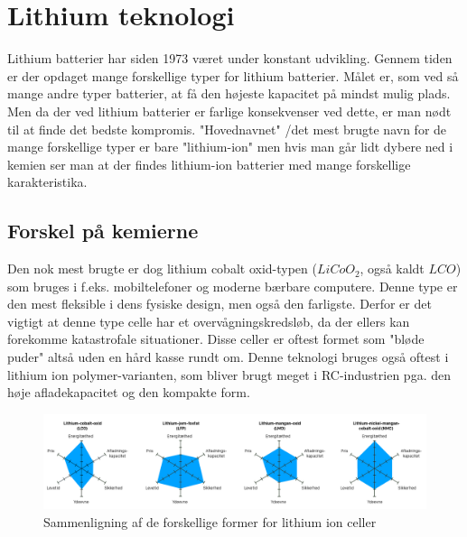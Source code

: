 \section{Lithium teknologi}
Lithium batterier har siden 1973 været under konstant udvikling. Gennem tiden er der opdaget mange forskellige typer for lithium batterier. Målet er, som ved så mange andre typer batterier, at få den højeste kapacitet på mindst mulig plads. Men da der ved lithium batterier er farlige konsekvenser ved dette, er man nødt til at finde det bedste kompromis. "Hovednavnet" \space /det mest brugte navn for de mange forskellige typer er bare "lithium-ion" \space men hvis man går lidt dybere ned i kemien ser man at der findes lithium-ion batterier med mange forskellige karakteristika. 

\subsection{Forskel på kemierne}
Den nok mest brugte er dog lithium cobalt oxid-typen ($LiCoO_2$, også kaldt $LCO$) som bruges i f.eks. mobiltelefoner og moderne bærbare computere. Denne type er den mest fleksible i dens fysiske design, men også den farligste. Derfor er det vigtigt at denne type celle har et overvågningskredsløb, da der ellers kan forekomme katastrofale situationer. Disse celler er oftest formet som "bløde puder" \space \textemdash \space altså uden en hård kasse rundt om. Denne teknologi bruges også oftest i lithium ion polymer-varianten, som bliver brugt meget i RC-industrien pga. den høje afladekapacitet og den kompakte form.

\begin{figure}[h]
	\centering
	\includegraphics[width=15cm]{billeder/chemical-comparison.png}
	\caption{Sammenligning af de forskellige former for lithium ion celler\protect\footnotemark}
	\label{fig:lithium_variants_comparison}
\end{figure}


